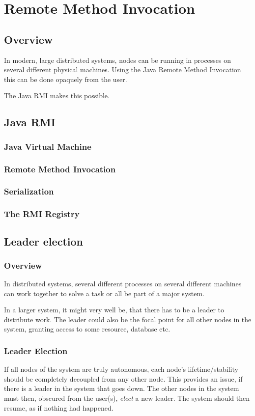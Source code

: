\chapter{Remote Method Invocation}
\section{Overview}
In modern, large distributed systems, nodes can be running in processes on several different physical machines. Using the Java Remote Method Invocation this can be done opaquely from the user. 

The Java RMI makes this possible. 

\section{Java RMI}
\subsection{Java Virtual Machine}
\subsection{Remote Method Invocation}

\subsection{Serialization}

\subsection{The RMI Registry}

\section{Leader election}
\subsection{Overview}
In distributed systems, several different processes on several different machines can work together to solve a task or all be part of a major system.

In a larger system, it might very well be, that there has to be a leader to distribute work. The leader could also be the focal point for all other nodes in the system, granting access to some resource, database etc. 

\subsection{Leader Election}
If all nodes of the system are truly autonomous, each node's lifetime/stability should be completely decoupled from any other node. This provides an issue, if there is a leader in the system that goes down. 
The other nodes in the system must then, obscured from the user(s), \textit{elect} a new leader. The system should then resume, as if nothing had happened. 

